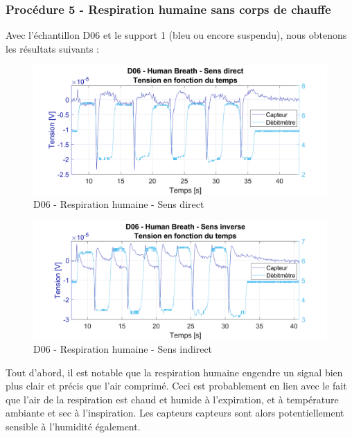 \subsubsection{Procédure 5 - Respiration humaine sans corps de chauffe}
Avec l'échantillon D06 et le support 1 (bleu ou encore suspendu), nous obtenons les résultats suivants :
\begin{figure}[H]
    \centering
    \includegraphics[scale = 0.5]{assets/figures/D06_hb_direct.svg}
    \caption{D06 - Respiration humaine - Sens direct}
    \label{fig:d06_hb_direct}
\end{figure}
\begin{figure}[H]
    \centering
    \includegraphics[scale = 0.5]{assets/figures/D06_hb_indirect2.svg}
    \caption{D06 - Respiration humaine - Sens indirect}
    \label{fig:d06_hb_indirect}
\end{figure}

Tout d'abord, il est notable que la respiration humaine engendre un signal bien plus clair et précis que l'air comprimé. Ceci est probablement en lien avec le 
fait que l'air de la respiration est chaud et humide à l'expiration, et à température ambiante et sec à l'inspiration. Les capteurs \gls{capteur}s
sont alors potentiellement sensible à l'humidité également. \\

